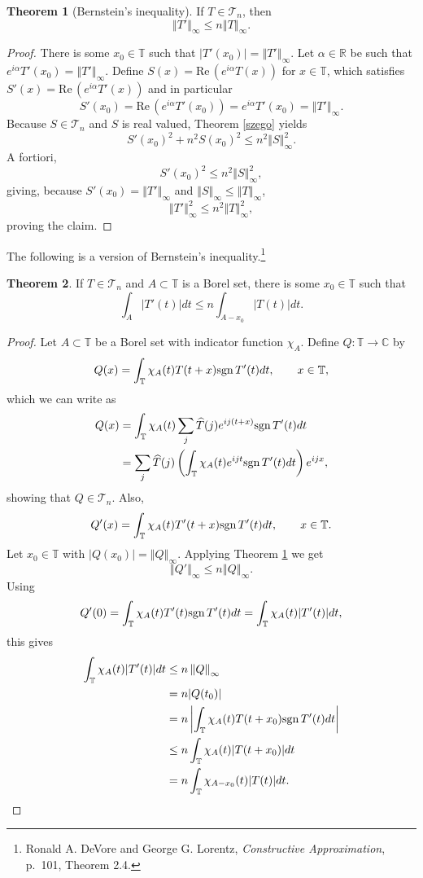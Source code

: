 \documentclass{article}
\def\Re{\ensuremath{\mathrm{Re}}\,}
\newcommand{\sgn}{\ensuremath\mathrm{sgn}\,}
\newcommand{\norm}[1]{\left\Vert #1 \right\Vert}
\theoremstyle{definition}
\newtheorem{theorem}{Theorem}
\theoremstyle{definition}
\begin{document}
\begin{theorem}[Bernstein's inequality]
If $T \in \mathscr{T}_n$, then
\[
\norm{T'}_\infty \leq n \norm{T}_\infty.
\]
\label{bernstein}
\end{theorem}
\begin{proof}
There is some $x_0 \in \mathbb{T}$ such that $|T'(x_0)| = \norm{T'}_\infty$. 
Let $\alpha \in \mathbb{R}$ be such that
$e^{i\alpha} T'(x_0) = \norm{T'}_\infty$. 
Define $S(x)=\Re(e^{i\alpha} T(x))$ for $x \in \mathbb{T}$, which
satisfies $S'(x)=\Re(e^{i\alpha} T'(x))$ and in particular
\[
S'(x_0)=\Re(e^{i\alpha} T'(x_0))=
e^{i\alpha} T'(x_0)=\norm{T'}_\infty.
\]
Because $S \in \mathscr{T}_n$ and $S$ is real valued,  
Theorem \ref{szego} yields
\[
S'(x_0)^2+n^2 S(x_0)^2 \leq n^2 \norm{S}_\infty^2.
\]
A fortiori,
\[
S'(x_0)^2 \leq n^2 \norm{S}_\infty^2,
\]
giving, because $S'(x_0)=\norm{T'}_\infty$ and
$\norm{S}_\infty \leq \norm{T}_\infty$,
\[
\norm{T'}_\infty^2 \leq n^2  \norm{T}_\infty^2,
\]
proving the claim.
\end{proof}



The following is a version of Bernstein's inequality.\footnote{Ronald A. DeVore and George G. Lorentz,
{\em Constructive Approximation}, p.~101, Theorem 2.4.} 

\begin{theorem}
If $T \in \mathscr{T}_n$
and $A \subset \mathbb{T}$ is a Borel set, there is some $x_0 \in \mathbb{T}$ such that
\[
\int_A |T'(t)| dt \leq n \int_{A-x_0} |T(t)| dt.
\]
\end{theorem}
\begin{proof}
Let $A \subset \mathbb{T}$ be a Borel set with indicator function $\chi_A$.
Define
$Q:\mathbb{T} \to \mathbb{C}$ by
\[
Q(x) = \int_{\mathbb{T}} \chi_A(t) T(t+x) \sgn T'(t) dt, \qquad x \in
\mathbb{T},
\]
which we can write as
\begin{align*}
Q(x)&=\int_{\mathbb{T}} \chi_A(t) \sum_j \widehat{T}(j) e^{ij(t+x)} \sgn T'(t) dt\\
&=\sum_j \widehat{T}(j) \left( \int_{\mathbb{T}} \chi_A(t) e^{ijt} \sgn T'(t) dt \right)   e^{ijx},
\end{align*}
showing that $Q \in \mathscr{T}_n$.  Also,
\[
Q'(x) = \int_{\mathbb{T}} \chi_A(t) T'(t+x) \sgn T'(t) dt, \qquad x \in \mathbb{T}.
\]
 Let
$x_0 \in \mathbb{T}$ with $|Q(x_0)| = \norm{Q}_\infty$. Applying
Theorem \ref{bernstein} we get
\[
\norm{Q'}_\infty \leq n \norm{Q}_\infty.
\]
Using
\[
Q'(0) = \int_{\mathbb{T}} \chi_A(t) T'(t) \sgn T'(t) dt
=\int_{\mathbb{T}} \chi_A(t) |T'(t)| dt,
\]
this gives
\begin{align*}
\int_{\mathbb{T}} \chi_A(t) |T'(t)| dt&\leq n \norm{Q}_\infty\\
&=n|Q(t_0)|\\
&=n\left| \int_{\mathbb{T}} \chi_A(t) T(t+x_0) \sgn T'(t) dt \right|\\
&\leq n \int_{\mathbb{T}} \chi_A(t) |T(t+x_0)| dt\\
&=n \int_{\mathbb{T}} \chi_{A-x_0}(t) |T(t)| dt.
\end{align*}
\end{proof}
\end{document}
